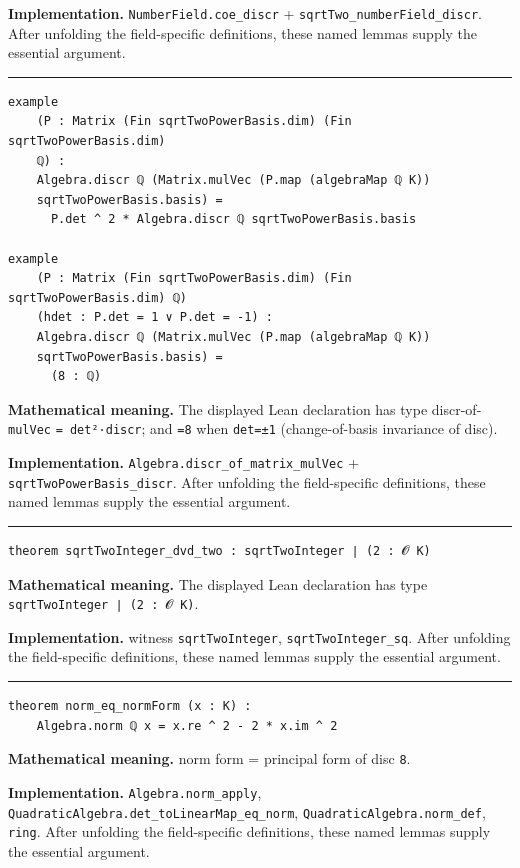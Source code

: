 \documentclass[UTF8,a4paper,11pt,fontset=fandol]{ctexart}
\theoremstyle{definition}
\newcommand{\statementsep}{\par\medskip\hrule\medskip}
\begin{document}
\noindent\textbf{Implementation.} \texttt{NumberField.\allowbreak{}coe\_\allowbreak{}discr} + \texttt{sqrtTwo\_\allowbreak{}numberField\_\allowbreak{}discr}. After unfolding the field-specific definitions, these named lemmas supply the essential argument.\par
\statementsep
\begin{verbatim}
example
    (P : Matrix (Fin sqrtTwoPowerBasis.dim) (Fin sqrtTwoPowerBasis.dim)
    ℚ) :
    Algebra.discr ℚ (Matrix.mulVec (P.map (algebraMap ℚ K))
    sqrtTwoPowerBasis.basis) =
      P.det ^ 2 * Algebra.discr ℚ sqrtTwoPowerBasis.basis

example
    (P : Matrix (Fin sqrtTwoPowerBasis.dim) (Fin sqrtTwoPowerBasis.dim) ℚ)
    (hdet : P.det = 1 ∨ P.det = -1) :
    Algebra.discr ℚ (Matrix.mulVec (P.map (algebraMap ℚ K))
    sqrtTwoPowerBasis.basis) =
      (8 : ℚ)
\end{verbatim}
\noindent\textbf{Mathematical meaning.} The displayed Lean declaration has type discr-of-\texttt{mulVec} \texttt{= det²·discr}; and \texttt{=8} when \texttt{det=±1} (change-of-basis invariance of disc).\par
\noindent\textbf{Implementation.} \texttt{Algebra.\allowbreak{}discr\_\allowbreak{}of\_\allowbreak{}matrix\_\allowbreak{}mulVec} + \texttt{sqrtTwoPowerBasis\_\allowbreak{}discr}. After unfolding the field-specific definitions, these named lemmas supply the essential argument.\par
\statementsep
\begin{verbatim}
theorem sqrtTwoInteger_dvd_two : sqrtTwoInteger ∣ (2 : 𝓞 K)
\end{verbatim}
\noindent\textbf{Mathematical meaning.} The displayed Lean declaration has type \texttt{sqrtTwoInteger ∣ (2 : 𝓞 K)}.\par
\noindent\textbf{Implementation.} witness \texttt{sqrtTwoInteger}, \texttt{sqrtTwoInteger\_\allowbreak{}sq}. After unfolding the field-specific definitions, these named lemmas supply the essential argument.\par
\statementsep
\begin{verbatim}
theorem norm_eq_normForm (x : K) :
    Algebra.norm ℚ x = x.re ^ 2 - 2 * x.im ^ 2
\end{verbatim}
\noindent\textbf{Mathematical meaning.} norm form = principal form of disc \texttt{8}.\par
\noindent\textbf{Implementation.} \texttt{Algebra.\allowbreak{}norm\_\allowbreak{}apply}, \texttt{QuadraticAlgebra.\allowbreak{}det\_\allowbreak{}toLinearMap\_\allowbreak{}eq\_\allowbreak{}norm}, \texttt{QuadraticAlgebra.\allowbreak{}norm\_\allowbreak{}def}, \texttt{ring}. After unfolding the field-specific definitions, these named lemmas supply the essential argument.\par
\end{document}
